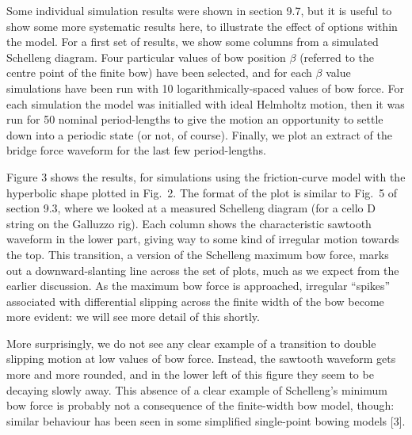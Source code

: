   Some individual simulation results were shown in section 9.7, but it is 
  useful to show some more systematic results here, to illustrate the effect of 
  options within the model. For a first set of results, we show some columns 
  from a simulated Schelleng diagram. Four particular values of bow position 
  $\beta$ (referred to the centre point of the finite bow) have been selected, 
  and for each $\beta$ value simulations have been run with 10 
  logarithmically-spaced values of bow force. For each simulation the model was 
  initialled with ideal Helmholtz motion, then it was run for 50 nominal 
  period-lengths to give the motion an opportunity to settle down into a 
  periodic state (or not, of course). Finally, we plot an extract of the bridge 
  force waveform for the last few period-lengths. 

  Figure 3 shows the results, for simulations using the friction-curve model 
  with the hyperbolic shape plotted in Fig.\ 2. The format of the plot is 
  similar to Fig.\ 5 of section 9.3, where we looked at a measured Schelleng 
  diagram (for a cello D string on the Galluzzo rig). Each column shows the 
  characteristic sawtooth waveform in the lower part, giving way to some kind 
  of irregular motion towards the top. This transition, a version of the 
  Schelleng maximum bow force, marks out a downward-slanting line across the 
  set of plots, much as we expect from the earlier discussion. As the maximum 
  bow force is approached, irregular “spikes” associated with differential 
  slipping across the finite width of the bow become more evident: we will see 
  more detail of this shortly. 


  More surprisingly, we do not see any clear example of a transition to double 
  slipping motion at low values of bow force. Instead, the sawtooth waveform 
  gets more and more rounded, and in the lower left of this figure they seem to 
  be decaying slowly away. This absence of a clear example of Schelleng’s 
  minimum bow force is probably not a consequence of the finite-width bow 
  model, though: similar behaviour has been seen in some simplified 
  single-point bowing models [3]. 

